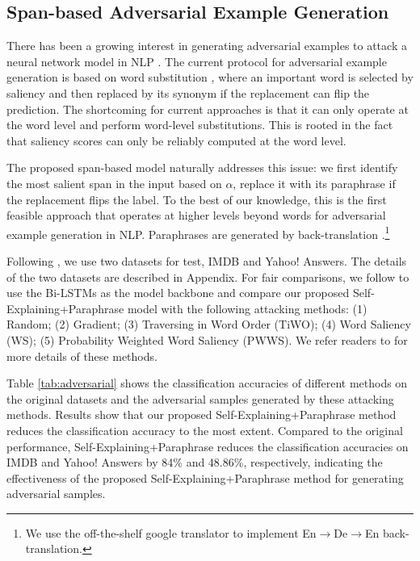 \documentclass[11pt,a4paper]{article}
\begin{document}
\subsection{Span-based Adversarial Example Generation}
There has been a growing interest in generating adversarial examples to attack a neural network model in NLP \citep{alzantot2018generating,ren-etal-2019-generating,zhang2020adversarial}. 
The current  protocol for adversarial example generation is based on word substitution \citep{liang2017deep,ebrahimi2017hotflip,samanta2017towards,ren-etal-2019-generating}, where an important word is  selected by saliency  and then 
replaced by its synonym if the replacement can flip the prediction. 
The shortcoming for current approaches is that it can only operate at the word level and perform word-level substitutions. This is rooted in the fact that 
 saliency scores can only be reliably computed at the word level.

The proposed span-based model naturally addresses this issue: 
we  first  identify the most salient span in the input based on $\alpha$, replace it with its paraphrase if the replacement flips the label.
To the best of our knowledge, this is the first feasible approach that operates at higher levels beyond words for adversarial example generation in NLP. 
Paraphrases are generated by 
back-translation \citep{sennrich2016back-translation,edunov2018understanding}.\footnote{We use the 
off-the-shelf google translator to implement En$\rightarrow$De$\rightarrow$En back-translation.} 

Following \citet{ren-etal-2019-generating}, 
we use two datasets for test, IMDB \citep{maas2011learning} and Yahoo! Answers.
The details of the two datasets are described in Appendix. 
For fair comparisons, we follow \citet{ren-etal-2019-generating} to use the Bi-LSTMs as the model backbone and compare our proposed Self-Explaining+Paraphrase model with the following attacking methods: (1) Random; (2) {Gradient}; (3) {Traversing in Word Order (TiWO)}; (4) {Word Saliency (WS)}; (5) Probability Weighted Word Saliency (PWWS). We refer readers to  \citet{ren-etal-2019-generating} for more details of these methods.

Table \ref{tab:adversarial} shows the classification accuracies of different methods on the original datasets and the adversarial samples generated by these attacking methods. 
Results show that our proposed Self-Explaining+Paraphrase method reduces the classification accuracy to the most extent. Compared to the original performance, Self-Explaining+Paraphrase reduces the classification accuracies on IMDB and Yahoo! Answers by 84\% and 48.86\%, respectively, indicating the effectiveness of the proposed Self-Explaining+Paraphrase method for generating adversarial samples.
\end{document}
